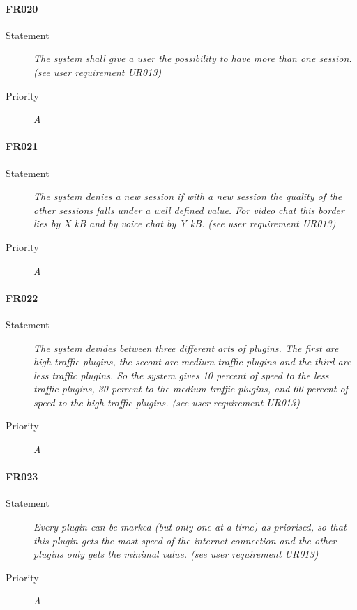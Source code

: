 \paragraph{FR020}
\begin{description}
  \item [Statement] 
    \textit{The system shall give a user the possibility to have more than one session.
    (see user requirement UR013)}
  \item [Priority] \textit{A}
\end{description}

\paragraph{FR021}
\begin{description}
  \item [Statement] 
    \textit{The system denies a new session if with a new session the quality of the other sessions falls under a well defined value. For video chat this border lies by X kB and by voice chat by Y kB.
    (see user requirement UR013)}
  \item [Priority] \textit{A}
\end{description}

\paragraph{FR022}
\begin{description}
  \item [Statement] 
    \textit{The system devides between three different arts of plugins. The first are high traffic plugins, the secont are medium traffic plugins and the third are less traffic plugins. So the system gives 10 percent of speed to the less traffic plugins, 30 percent to the medium traffic plugins, and 60 percent of speed to the high traffic plugins.
    (see user requirement UR013)}
  \item [Priority] \textit{A}
\end{description}

\paragraph{FR023}
\begin{description}
  \item [Statement] 
    \textit{Every plugin can be marked (but only one at a time) as priorised, so that this plugin gets the most speed of the internet connection and the other plugins only gets the minimal value.
    (see user requirement UR013)}
  \item [Priority] \textit{A}
\end{description}

